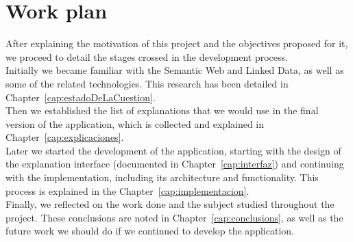 \section{Work plan}

After explaining the motivation of this project and the objectives proposed for it, we proceed to detail the stages crossed in the development process.\\

Initially we became familiar with the Semantic Web and Linked Data, as well as some of the related technologies. This research has been detailed in Chapter~\ref{cap:estadoDeLaCuestion}.\\

Then we established the list of explanations that we would use in the final version of the application, which is collected and explained in Chapter~\ref{cap:explicaciones}.\\

Later we started the development of the application, starting with the design of the explanation interface (documented in Chapter~\ref{cap:interfaz}) and continuing with the implementation, including its architecture and functionality. This process is explained in the Chapter~\ref{cap:implementacion}.\\

Finally, we reflected on the work done and the subject studied throughout the project. These conclusions are noted in Chapter~\ref{cap:conclusions}, as well as the future work we should do if we continued to develop the application.\\